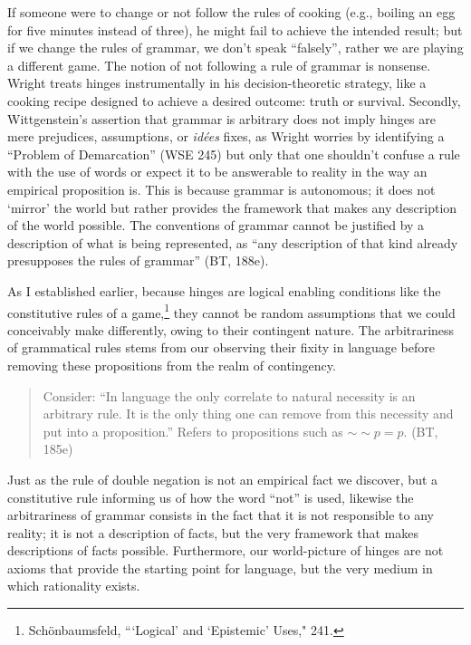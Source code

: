 \noindent If someone were to change or not follow the rules of cooking (e.g.,
boiling an egg for five minutes instead of three), he might fail to
achieve the intended result; but if we change the rules of grammar, we
don't speak ``falsely'', rather we are playing a different game. The
notion of not following a rule of grammar is nonsense. Wright treats
hinges instrumentally in his decision-theoretic strategy, like a cooking
recipe designed to achieve a desired outcome: truth or survival.
Secondly, Wittgenstein's assertion that grammar is arbitrary does not
imply hinges are mere prejudices, assumptions, or \emph{idées} fixes, as
Wright worries by identifying a ``Problem of Demarcation'' (WSE 245) but
only that one shouldn't confuse a rule with the use of words or expect
it to be answerable to reality in the way an empirical proposition is.
This is because grammar is autonomous; it does not `mirror' the world
but rather provides the framework that makes any description of the
world possible. The conventions of grammar cannot be justified by a
description of what is being represented, as ``any description of that
kind already presupposes the rules of grammar'' (BT, 188e).

As I established earlier, because hinges are logical enabling conditions
like the constitutive rules of a game,\footnote{Schönbaumsfeld,
  ```Logical' and `Epistemic' Uses," 241.} they cannot be random
assumptions that we could conceivably make differently, owing to their
contingent nature. The arbitrariness of grammatical rules stems from our
observing their fixity in language before removing these propositions
from the realm of contingency.

\begin{quote}
Consider: ``In language the only correlate to natural necessity is an
arbitrary rule. It is the only thing one can remove from this necessity
and put into a proposition.'' Refers to propositions such as $\sim \sim p = p$. (BT, 185e)
\end{quote}

\noindent Just as the rule of double negation is not an empirical fact we
discover, but a constitutive rule informing us of how the word ``not''
is used, likewise the arbitrariness of grammar consists in the fact that
it is not responsible to any reality; it is not a description of facts,
but the very framework that makes descriptions of facts possible.
Furthermore, our world-picture of hinges are not axioms that provide the
starting point for language, but the very medium in which rationality
exists.

